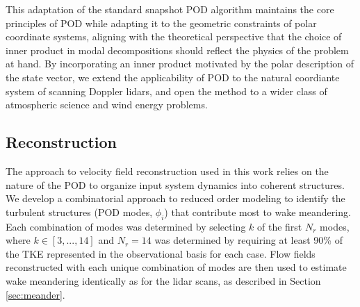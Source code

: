 \documentclass[%
 aip,
 amsmath,
 amssymb,
]{revtex4-2}
\begin{document}
This adaptation of the standard snapshot POD algorithm maintains the core principles of POD while adapting it to the geometric constraints of polar coordinate systems, aligning with the theoretical perspective that the choice of inner product in modal decompositions should reflect the physics of the problem at hand.\citet{holmes2012turbulence} 
By incorporating an inner product motivated by the polar description of the state vector, we extend the applicability of POD to the natural coordiante system of scanning Doppler lidars, and open the method to a wider class of atmospheric science and wind energy problems.


\subsection{Reconstruction}
\label{sec:rec}

The approach to velocity field reconstruction used in this work relies on the nature of the POD to organize input system dynamics into coherent structures.
We develop a combinatorial approach to reduced order modeling  to identify the turbulent structures (POD modes, $\phi_i$) that contribute most to wake meandering.
Each combination of modes was determined by selecting $k$ of the first $N_r$ modes, where $k \in[3,...,14]$ and $N_r=14$ was determined by requiring at least 90\% of the TKE represented in the observational basis for each case. 
Flow fields reconstructed with each unique combination of modes are then used to estimate wake meandering identically as for the lidar scans, as described in Section \ref{sec:meander}. 
\end{document}
